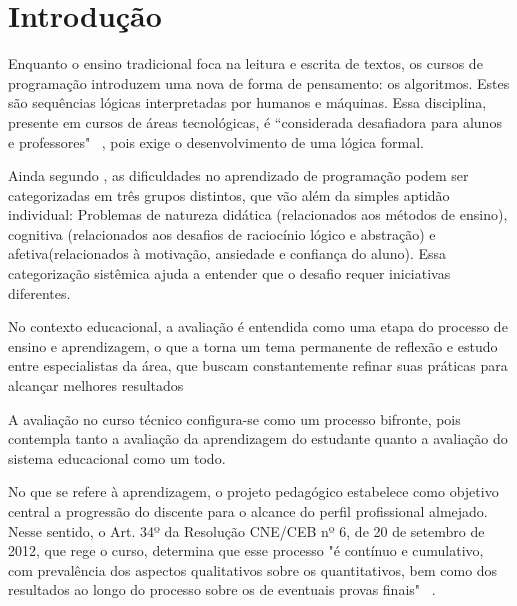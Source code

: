 
\chapter{Introdução}\label{cap:introducao}


Enquanto o ensino tradicional foca na leitura e escrita de textos, os cursos de programação introduzem uma nova
de forma de pensamento: os algoritmos. Estes são sequências lógicas interpretadas por humanos 
e máquinas. Essa disciplina, presente em cursos de áreas tecnológicas, é ``considerada desafiadora para alunos 
e professores"~ \cite{raabe2005ambiente}, pois exige o desenvolvimento de uma lógica formal.

Ainda segundo \cite{raabe2005ambiente}, as dificuldades no aprendizado de programação podem ser categorizadas
em três grupos distintos, que vão além da simples aptidão individual: Problemas de natureza didática 
(relacionados aos métodos de ensino), cognitiva (relacionados aos desafios de raciocínio lógico e  abstração) e 
afetiva(relacionados à motivação, ansiedade e confiança do aluno). Essa categorização sistêmica ajuda a
entender que o desafio requer iniciativas diferentes.  

No contexto educacional, a avaliação é entendida como uma etapa do processo de ensino e aprendizagem, o que a 
torna um tema permanente de reflexão e estudo entre especialistas da área, que buscam constantemente refinar 
suas práticas para alcançar melhores resultados \cite{lima2022avaliaccao}

A avaliação no curso técnico configura-se como um processo bifronte, pois contempla tanto a avaliação da aprendizagem do estudante quanto a avaliação do sistema educacional como um todo.

No que se refere à aprendizagem, o projeto pedagógico estabelece como objetivo central a progressão do discente para o alcance do perfil profissional almejado. Nesse sentido, o Art. 34º da Resolução CNE/CEB nº 6, de 20 de setembro de 2012, que rege o curso, determina que esse processo "é contínuo e cumulativo, com prevalência dos aspectos qualitativos sobre os quantitativos, bem como dos resultados ao longo do processo sobre os de eventuais provas finais" ~\cite{IFAM2020}.

